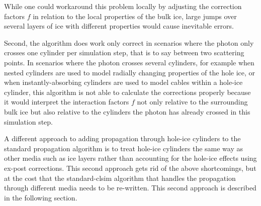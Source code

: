 While one could workaround this problem locally by adjusting the correction factors $f$ in relation to the local properties of the bulk ice, large jumps over several layers of ice with different properties would cause inevitable errors.

Second, the algorithm does work only correct in scenarios where the photon only crosses one cylinder per simulation step, that is to say between two scattering points. In scenarios where the photon crosses several cylinders, for example when nested cylinders are used to model radially changing properties of the hole ice, or when instantly-absorbing cylinders are used to model cables within a hole-ice cylinder, this algorithm is not able to calculate the corrections properly because it would interpret the interaction factors $f$ not only relative to the surrounding bulk ice but also relative to the cylinders the photon has already crossed in this simulation step.

A different approach to adding propagation through hole-ice cylinders to the standard propagation algorithm is to treat hole-ice cylinders the same way as other media such as ice layers rather than accounting for the hole-ice effects using ex-post corrections. This second approach gets rid of the above shortcomings, but at the cost that the standard-clsim algorithm that handles the propagation through different media needs to be re-written. This second approach is described in the following section.